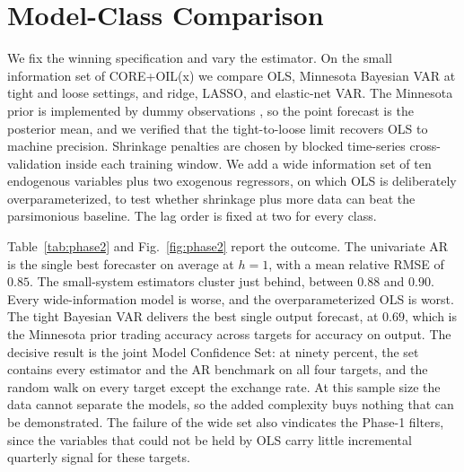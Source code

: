 \documentclass[conference]{IEEEtran}
\begin{document}
\section{Model-Class Comparison}
We fix the winning specification and vary the estimator. On the small information set of CORE+OIL(x) we compare OLS, Minnesota Bayesian VAR at tight and loose settings, and ridge, LASSO, and elastic-net VAR. The Minnesota prior is implemented by dummy observations \cite{bgr2010}, so the point forecast is the posterior mean, and we verified that the tight-to-loose limit recovers OLS to machine precision. Shrinkage penalties are chosen by blocked time-series cross-validation inside each training window. We add a wide information set of ten endogenous variables plus two exogenous regressors, on which OLS is deliberately overparameterized, to test whether shrinkage plus more data can beat the parsimonious baseline. The lag order is fixed at two for every class.

Table~\ref{tab:phase2} and Fig.~\ref{fig:phase2} report the outcome. The univariate AR is the single best forecaster on average at $h=1$, with a mean relative RMSE of $0.85$. The small-system estimators cluster just behind, between $0.88$ and $0.90$. Every wide-information model is worse, and the overparameterized OLS is worst. The tight Bayesian VAR delivers the best single output forecast, at $0.69$, which is the Minnesota prior trading accuracy across targets for accuracy on output. The decisive result is the joint Model Confidence Set: at ninety percent, the set contains every estimator and the AR benchmark on all four targets, and the random walk on every target except the exchange rate. At this sample size the data cannot separate the models, so the added complexity buys nothing that can be demonstrated. The failure of the wide set also vindicates the Phase-1 filters, since the variables that could not be held by OLS carry little incremental quarterly signal for these targets.
\end{document}
